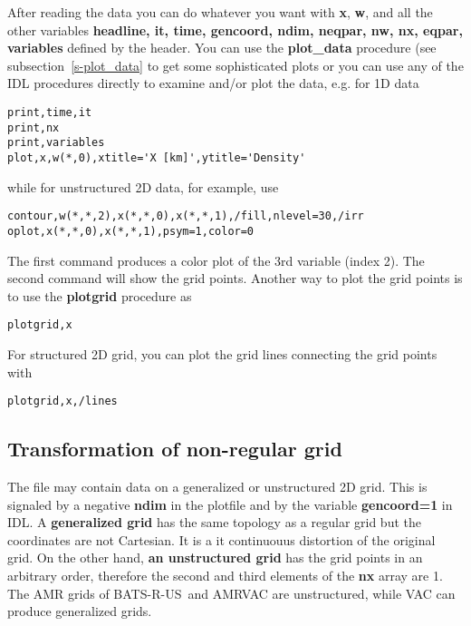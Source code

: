 \documentclass{article}
\newcommand{\BATSRUS}{BATS-R-US}
\begin{document}
   After reading the data you can do whatever you want with {\bf x}, {\bf w}, 
   and all the other variables 
   {\bf headline, it, time, gencoord, ndim, neqpar, nw, nx, eqpar, variables}
   defined by the header. 
   You can use the {\bf plot\_data} procedure (see subsection~\ref{s-plot_data}
   to get some sophisticated plots or you can use any of the IDL procedures 
   directly to examine and/or plot the data, e.g. for 1D data
\begin{verbatim}
print,time,it
print,nx
print,variables
plot,x,w(*,0),xtitle='X [km]',ytitle='Density'
\end{verbatim}
   while for unstructured 2D data, for example, use
\begin{verbatim}
contour,w(*,*,2),x(*,*,0),x(*,*,1),/fill,nlevel=30,/irr
oplot,x(*,*,0),x(*,*,1),psym=1,color=0
\end{verbatim}
   The first command produces a color plot of the 3rd variable (index 2).
   The second command will show the grid points. Another way to plot the
   grid points is to use the {\bf plotgrid} procedure as
\begin{verbatim}
plotgrid,x
\end{verbatim}
   For structured 2D grid, you can plot the grid lines connecting
   the grid points with 
\begin{verbatim}
plotgrid,x,/lines
\end{verbatim}

\subsection{Transformation of non-regular grid \label{s-transform}}

   The file may contain data on a generalized or unstructured 2D grid.
   This is signaled by a negative {\bf ndim} in the plotfile 
   and by the variable {\bf gencoord=1} in IDL.
   A {\bf generalized grid} has the same topology as a regular grid
   but the coordinates are not Cartesian. It is a {it continuouus}
   distortion of the original grid. On the other hand, 
   {\bf an unstructured grid} has the grid points in an arbitrary
   order, therefore the second and third elements of the 
   {\bf nx} array are 1. The AMR grids of \BATSRUS\ and AMRVAC are
   unstructured, while VAC can produce generalized grids.
\end{document}
